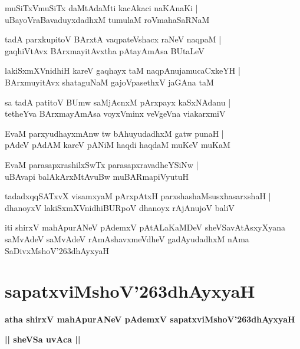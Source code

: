 \documentclass[twoside,12pt,openright]{book}
\def\S{\char'263}
\newcounter{shloka}[chapter]
\def\uvaca#1{\centerline{{\large\textbf{#1}}}}
\begin{document}
\begin{shloka}%
muSiTxVmuSiTx daMtAdaMti kacAkaci naKAnaKi |\\
uBayoVraBavaduyxdadhxM tumulaM roVmahaSaRNaM 
\end{shloka}

\begin{shloka}%
tadA parxkupitoV BArxtA vaqpateVshacx raNeV naqpaM |\\
gaqhiVtAvx BArxmayitAvxtha pAtayAmAsa BUtaLeV 
\end{shloka}

\begin{shloka}%
lakiSxmXVnidhiH kareV gaqhayx taM naqpAnujamucaCxkeYH |\\
BArxmuyitAvx shataguNaM gajoVpasethxV jaGAna taM
\end{shloka}

\begin{shloka}%
sa tadA patitoV BUmw saMjAcnxM pArxpayx kaSxNAdanu |\\
tetheYva BArxmayAmAsa voyxVminx veVgeVna viakarxmiV 
\end{shloka}

\begin{shloka}%
EvaM parxyudhayxmAnw tw bAhuyudadhxM gatw punaH |\\
pAdeV pAdAM kareV pANiM haqdi haqdaM muKeV muKaM 
\end{shloka}

\begin{shloka}%
EvaM parasapxrashilxSwTx parasapxravadheYSiNw |\\
uBAvapi balAkArxMtAvuBw muBARmapiVyutuH 
\end{shloka}

\begin{shloka}%
tadadxqqSATxvX visamxyaM pArxpAtxH parxshashaMsusxhasarxshaH |\\
dhanoyxV lakiSxmXVnidhiBURpoV dhanoyx rAjAnujoV baliV 
\end{shloka}

\begin{center}
iti shirxV mahApurANeV pAdemxV pAtALaKaMDeV sheVSavAtAsxyXyana saMvAdeV 
saMvAdeV rAmAshavxmeVdheV gadAyudadhxM nAma SaDivxMshoV\S dhAyxyaH
\end{center}

\chapter{sapatxviMshoV\S dhAyxyaH}

\begin{center}
{\LARGE\bfseries atha shirxV mahApurANeV pAdemxV  sapatxviMshoV\S dhAyxyaH}
\end{center}
\uvaca{|| sheVSa uvAca ||}
\end{document}
